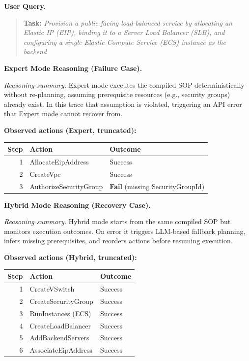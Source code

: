 \documentclass{article}
\theoremstyle{plain}
\theoremstyle{definition}
\theoremstyle{remark}
\begin{document}
\begin{tcolorbox}[title=\large\bfseries  Expert vs.\ Hybrid Reasoning Traces]
\label{app:expert_vs_hybrid_reasoning}
\medskip
\noindent\textbf{User Query.}

\begin{quote}
\small
\textbf{Task:} \textit{Provision a public-facing load-balanced service by allocating an Elastic IP (EIP),
binding it to a Server Load Balancer (SLB),
and configuring a single Elastic Compute Service (ECS) instance as the backend}
\end{quote}

\medskip
\noindent\textbf{Expert Mode Reasoning (Failure Case).}

\textit{Reasoning summary.}
Expert mode executes the compiled SOP deterministically without re-planning,
assuming prerequisite resources (e.g., security groups) already exist.
In this trace that assumption is violated, triggering an API error that Expert mode cannot recover from.

\medskip
\noindent\textbf{Observed actions (Expert, truncated):}
\begin{center}
\small
\begin{tabular}{r l l}
\toprule
Step & Action & Outcome \\
\midrule
1 & AllocateEipAddress & Success \\
2 & CreateVpc & Success \\
3 & AuthorizeSecurityGroup & \textbf{Fail} (missing SecurityGroupId) \\
\bottomrule
\end{tabular}
\end{center}

\medskip
\noindent\textbf{Hybrid Mode Reasoning (Recovery Case).}

\textit{Reasoning summary.}
Hybrid mode starts from the same compiled SOP but monitors execution outcomes.
On error it triggers LLM-based fallback planning, infers missing prerequisites, and reorders actions before resuming execution.

\medskip
\noindent\textbf{Observed actions (Hybrid, truncated):}
\begin{center}
\small
\begin{tabular}{r l l}
\toprule
Step & Action & Outcome \\
\midrule
1 & CreateVSwitch & Success \\
2 & CreateSecurityGroup & Success \\
3 & RunInstances (ECS) & Success \\
4 & CreateLoadBalancer & Success \\
5 & AddBackendServers & Success \\
6 & AssociateEipAddress & Success \\
\bottomrule
\end{tabular}
\end{center}


\end{tcolorbox}
\end{document}
